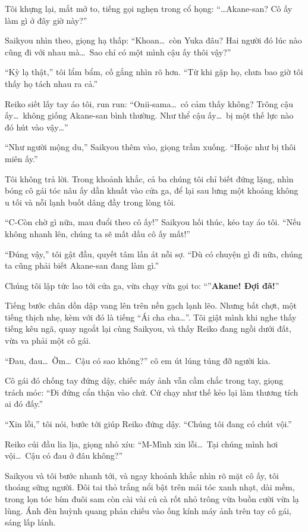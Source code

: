 \documentclass[../main.tex]{subfiles}
\begin{document}
Tôi khựng lại, mắt mở to, tiếng gọi nghẹn trong cổ họng: ``\dots Akane-san? Cô ấy làm gì ở đây giờ này?''

Saikyou nhìn theo, giọng hạ thấp: ``Khoan\dots\ còn Yuka đâu? Hai người đó lúc nào cũng đi với nhau mà\dots\ Sao chỉ có một mình cậu ấy thôi vậy?''

``Kỳ lạ thật,'' tôi lẩm bẩm, cố gắng nhìn rõ hơn. ``Từ khi gặp họ, chưa bao giờ tôi thấy họ tách nhau ra cả.''

Reiko siết lấy tay áo tôi, run run: ``Onii-sama\dots\ có cảm thấy không? Trông cậu ấy\dots\ không giống Akane-san bình thường. Như thể cậu ấy\dots\ bị một thế lực nào đó hút vào vậy\dots''

``Như người mộng du,'' Saikyou thêm vào, giọng trầm xuống. ``Hoặc như bị thôi miên ấy.''

Tôi không trả lời. Trong khoảnh khắc, cả ba chúng tôi chỉ biết đứng lặng, nhìn bóng cô gái tóc nâu ấy dần khuất vào cửa ga, để lại sau lưng một khoảng không u tối và nỗi lạnh buốt dâng đầy trong lòng tôi.

``C-Còn chờ gì nữa, mau đuổi theo cô ấy!'' Saikyou hối thúc, kéo tay áo tôi. ``Nếu không nhanh lên, chúng ta sẽ mất dấu cô ấy mất!''

``Đúng vậy,'' tôi gật đầu, quyết tâm lấn át nỗi sợ. ``Dù có chuyện gì đi nữa, chúng ta cũng phải biết Akane-san đang làm gì.''

Chúng tôi lập tức lao tới cửa ga, vừa chạy vừa gọi to: ``''\textbf{Akane! Đợi đã!}''

Tiếng bước chân dồn dập vang lên trên nền gạch lạnh lẽo. Nhưng bất chợt, một tiếng thịch nhẹ, kèm với đó là tiếng ``Ái cha cha\dots''. Tôi giật mình khi nghe thấy tiếng kêu ngã, quay ngoắt lại cùng Saikyou, và thấy Reiko đang ngồi dưới đất, vừa va phải một cô gái.


``Đau, đau\dots\ Ờm\dots\ Cậu có sao không?'' cô em út lúng túng đỡ người kia.

Cô gái đó chống tay đứng dậy, chiếc máy ảnh vẫn cầm chắc trong tay, giọng trách móc: ``Đi đứng cẩn thận vào chứ. Cứ chạy như thế kẻo lại làm thương tích ai đó đấy.''

``Xin lỗi,'' tôi nói, bước tới giúp Reiko đứng dậy. ``Chúng tôi đang có chút vội.''

Reiko cúi đầu lia lịa, giọng nhỏ xíu: ``M-Mình xin lỗi\dots\ Tại chúng mình hơi vội\dots\ Cậu có đau ở đâu không?''

Saikyou và tôi bước nhanh tới, và ngay khoảnh khắc nhìn rõ mặt cô ấy, tôi thoáng sững người. Đôi tai thỏ trắng nổi bật trên mái tóc xanh nhạt, dài mềm, trong lọn tóc bím đuôi sam còn cài vài củ cà rốt nhỏ trông vừa buồn cười vừa lạ lùng. Ánh đèn huỳnh quang phản chiếu vào ống kính máy ảnh trên tay cô gái, sáng lấp lánh.
\end{document}
